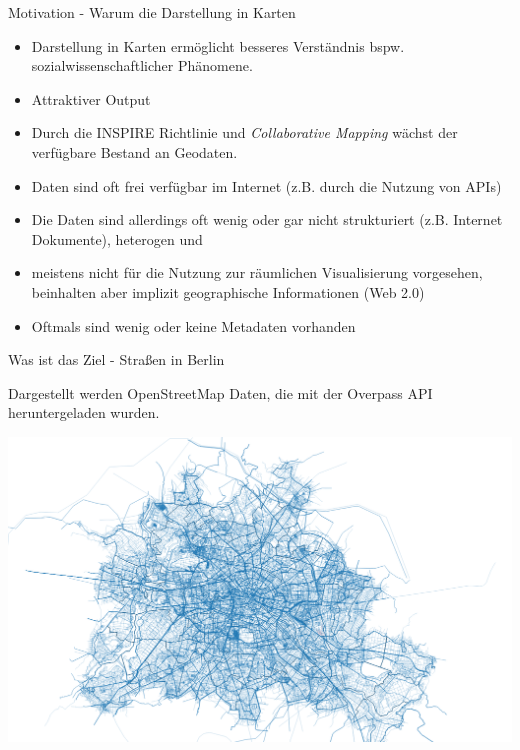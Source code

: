 \documentclass[ignorenonframetext,]{beamer}
\begin{document}
\begin{frame}{Motivation - Warum die Darstellung in Karten}

\begin{itemize}
\item
  Darstellung in Karten ermöglicht besseres Verständnis bspw.
  sozialwissenschaftlicher Phänomene.
\item
  Attraktiver Output
\item
  Durch die INSPIRE Richtlinie und \emph{Collaborative Mapping} wächst
  der verfügbare Bestand an Geodaten.
\item
  Daten sind oft frei verfügbar im Internet (z.B. durch die Nutzung von
  APIs)
\item
  Die Daten sind allerdings oft wenig oder gar nicht strukturiert (z.B.
  Internet Dokumente), heterogen und
\item
  meistens nicht für die Nutzung zur räumlichen Visualisierung
  vorgesehen, beinhalten aber implizit geographische Informationen (Web
  2.0)
\item
  Oftmals sind wenig oder keine Metadaten vorhanden
\end{itemize}

\end{frame}

\begin{frame}{Was ist das Ziel - Straßen in Berlin}

Dargestellt werden OpenStreetMap Daten, die mit der Overpass API
heruntergeladen wurden.

\includegraphics{figure/streets_Berlin2.png}

\end{frame}
\end{document}
